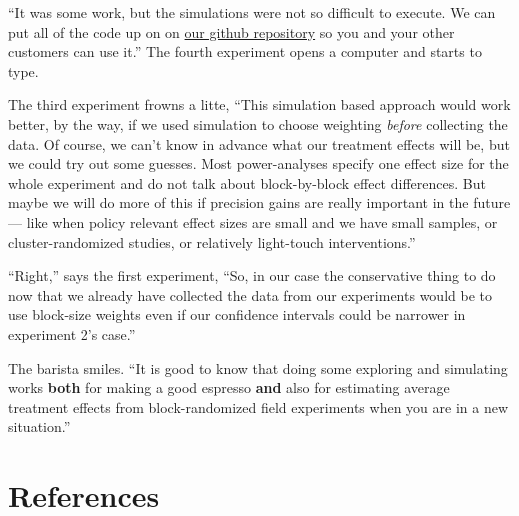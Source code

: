 \documentclass[
]{article}
\begin{document}
``It was some work, but the simulations were not so difficult to execute. We can
put all of the code up on on \href{https://github.com/egap/standards_discussions/block_rand}{our github
repository} so you
and your other customers can use it.'' The fourth experiment opens a computer
and starts to type.

The third experiment frowns a litte, ``This simulation based approach would work better, by the
way, if we used simulation to choose weighting \emph{before} collecting the data. Of course, we
can't know in advance what our treatment effects will be, but we could try out some guesses. Most power-analyses
specify one effect size for the whole experiment and do not talk about
block-by-block effect differences. But maybe we will do more of this if
precision gains are really important in the future --- like when policy
relevant effect sizes are small and we have small samples, or
cluster-randomized studies, or relatively light-touch interventions.''

``Right,'' says the first experiment, ``So, in our case the conservative thing to
do now that we already have collected the data from our experiments would be to
use block-size weights even if our confidence intervals could be narrower in
experiment 2's case.''

The barista smiles. ``It is good to know that doing some
exploring and simulating works \textbf{both} for making a good espresso \textbf{and} also
for estimating average treatment effects from block-randomized field
experiments when you are in a new situation.''

\hypertarget{references}{%
\section*{References}\label{references}}
\end{document}
